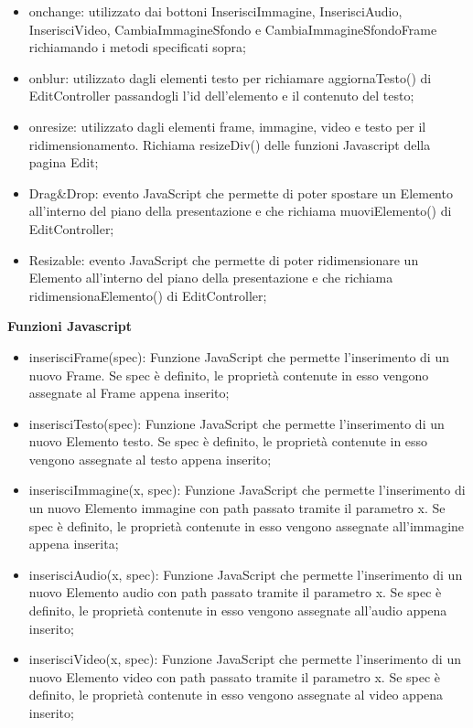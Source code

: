 {{\begin{itemize}
		\item onchange: utilizzato dai bottoni InserisciImmagine, InserisciAudio, InserisciVideo, CambiaImmagineSfondo e CambiaImmagineSfondoFrame richiamando i metodi specificati sopra;
		\item onblur: utilizzato dagli elementi testo per richiamare aggiornaTesto() di EditController passandogli l'id dell'elemento e il contenuto del testo;
		\item onresize: utilizzato dagli elementi frame, immagine, video e testo per il ridimensionamento. Richiama resizeDiv() delle funzioni Javascript della pagina Edit;
		\item Drag\&Drop: evento JavaScript che permette di poter spostare un Elemento all'interno del piano della presentazione e che richiama muoviElemento() di EditController;
		\item Resizable: evento JavaScript che permette di poter ridimensionare un Elemento all'interno del piano della presentazione e che richiama ridimensionaElemento() di EditController;
	\end{itemize}
	\textbf{Funzioni Javascript}
	\begin{itemize}
		\item inserisciFrame(spec): Funzione JavaScript che permette l'inserimento di un nuovo Frame. Se spec è definito, le proprietà contenute in esso vengono assegnate al Frame appena inserito;
		\item inserisciTesto(spec): Funzione JavaScript che permette l'inserimento di un nuovo Elemento testo. Se spec è definito, le proprietà contenute in esso vengono assegnate al testo appena inserito;
		\item inserisciImmagine(x, spec): Funzione JavaScript che permette l'inserimento di un nuovo Elemento immagine con path passato tramite il parametro x. Se spec è definito, le proprietà contenute in esso vengono assegnate all'immagine appena inserita;
		\item inserisciAudio(x, spec): Funzione JavaScript che permette l'inserimento di un nuovo Elemento audio con path passato tramite il parametro x. Se spec è definito, le proprietà contenute in esso vengono assegnate all'audio appena inserito;
		\item inserisciVideo(x, spec): Funzione JavaScript che permette l'inserimento di un nuovo Elemento video con path passato tramite il parametro x. Se spec è definito, le proprietà contenute in esso vengono assegnate al video appena inserito;

\end{itemize}}}
